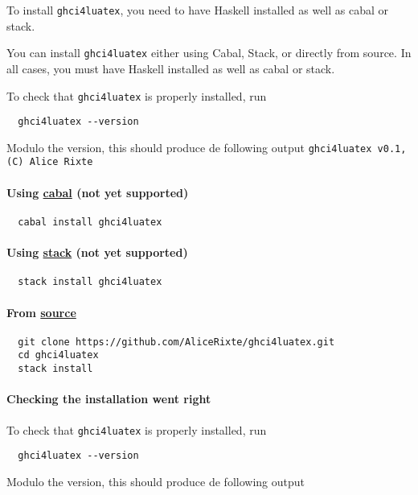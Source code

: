 \documentclass{article}
\begin{document}
To install \texttt{ghci4luatex}, you need to have Haskell installed as well as cabal or stack.

You can install \texttt{ghci4luatex} either using Cabal, Stack, or directly from source. In all cases, you must have Haskell installed as well as cabal or stack.

To check that \texttt{ghci4luatex} is properly installed, run

\begin{verbatim}
  ghci4luatex --version
\end{verbatim}
Modulo the version, this should produce de following output \texttt{ghci4luatex v0.1, (C) Alice Rixte}

\paragraph{Using \href{https://www.haskell.org/cabal/}{cabal} (not yet supported)}

\begin{verbatim}
  cabal install ghci4luatex
\end{verbatim}

\paragraph{Using \href{https://docs.haskellstack.org/en/stable/}{stack} (not yet supported)}

\begin{verbatim}
  stack install ghci4luatex
\end{verbatim}

\paragraph{From  \href{https://github.com/AliceRixte/ghci4luatex/}{source}}

\begin{verbatim}
  git clone https://github.com/AliceRixte/ghci4luatex.git
  cd ghci4luatex
  stack install
\end{verbatim}

\paragraph{Checking the installation went right}
To check that \texttt{ghci4luatex} is properly installed, run

\begin{verbatim}
  ghci4luatex --version
\end{verbatim}
Modulo the version, this should produce de following output
\end{document}
